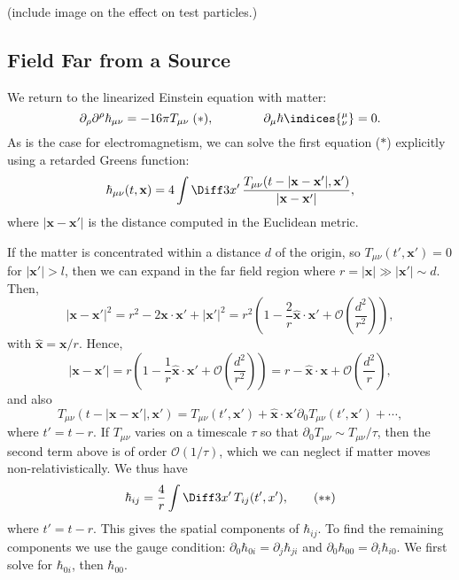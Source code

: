 \documentclass[12pt]{article}
\begin{document}

(include image on the effect on test particles.)

\subsection{Field Far from a Source}%
\label{sub:ffs}

We return to the linearized Einstein equation with matter:
\[
\partial_\rho \partial^{\rho} \hbar_{\mu\nu} = - 16\pi T_{\mu\nu} \; (\ast), \qquad \qquad \partial_\mu \hbar\indices{^{\mu}_{\nu}} = 0.
\]
As is the case for electromagnetism, we can solve the first equation ($\ast$) explicitly using a retarded Greens function:
\[
\hbar_{\mu\nu}(t, \mathbf{x}) = 4 \int \Diff 3 x'\, \frac{T_{\mu\nu} (t - |\mathbf{x} - \mathbf{x}'|, \mathbf{x}')}{|\mathbf{x} - \mathbf{x}'|},
\]
where $|\mathbf{x} - \mathbf{x}'|$ is the distance computed in the Euclidean metric.

If the matter is concentrated within a distance $d$ of the origin, so $T_{\mu\nu}(t', \mathbf{x}') = 0$ for $|\mathbf{x}'| > l$, then we can expand in the far field region where $r = |\mathbf{x}| \gg |\mathbf{x}'| \sim d$. Then,
\[
|\mathbf{x} - \mathbf{x}'|^2 = r^2 - 2 \mathbf{x} \cdot \mathbf{x}' + |\mathbf{x}'|^2 = r^2\left(1 - \frac{2}{r} \mathbf{\hat x} \cdot \mathbf{x}' + \mathcal{O} \left( \frac{d^2}{r^2} \right) \right),
\]
with $\mathbf{\hat x} = \mathbf{x}/r$. Hence,
\[
|\mathbf{x} - \mathbf{x}'| = r \left(1 - \frac{1}{r} \mathbf{\hat x} \cdot \mathbf{x}' + \mathcal{O}\left( \frac{d^2}{r^2} \right) \right) = r - \mathbf{\hat x} \cdot \mathbf{x} + \mathcal{O} \left( \frac{d^2}{r} \right),
\]
and also
\[
T_{\mu\nu}(t - |\mathbf{x} - \mathbf{x}'|, \mathbf{x}') = T_{\mu\nu} (t', \mathbf{x}') + \mathbf{\hat x} \cdot \mathbf{x}' \partial_0 T_{\mu\nu} (t', \mathbf{x}') + \cdots,
\]
where $t' = t - r$. If $T_{\mu\nu}$ varies on a timescale $\tau$ so that $\partial_0 T_{\mu\nu} \sim T_{\mu\nu} / \tau$, then the second term above is of order $\mathcal{O}(1/\tau)$, which we can neglect if matter moves non-relativistically. We thus have
\[
	\hbar_{ij} = \frac{4}{r}\int \Diff 3 x'\, T_{ij}(t', x'), \tag{$\ast\ast$}
\]
where $t' = t - r$. This gives the spatial components of $\hbar_{ij}$. To find the remaining components we use the gauge condition: $\partial_0 \hbar_{0i} = \partial_j \hbar_{ji}$ and $\partial_0 \hbar_{00} = \partial_i \hbar_{i0}$. We first solve for $\hbar_{0i}$, then $\hbar_{00}$.
\end{document}
